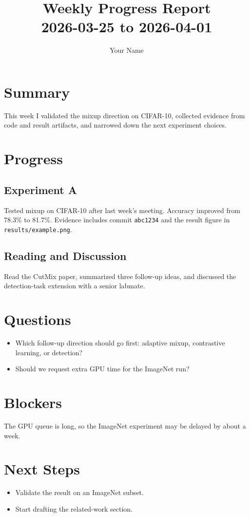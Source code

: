 \documentclass[11pt,a4paper]{article}
\title{Weekly Progress Report \\ \large 2026-03-25 to 2026-04-01}
\author{Your Name}
\date{}
\begin{document}
\maketitle

\section{Summary}
This week I validated the mixup direction on CIFAR-10, collected evidence from code and result artifacts, and narrowed down the next experiment choices.

\section{Progress}

\subsection{Experiment A}
Tested mixup on CIFAR-10 after last week's meeting. Accuracy improved from 78.3\% to 81.7\%. Evidence includes commit \texttt{abc1234} and the result figure in \texttt{results/example.png}.


\subsection{Reading and Discussion}
Read the CutMix paper, summarized three follow-up ideas, and discussed the detection-task extension with a senior labmate.

\section{Questions}
\begin{itemize}[leftmargin=2em]
  \item Which follow-up direction should go first: adaptive mixup, contrastive learning, or detection?
  \item Should we request extra GPU time for the ImageNet run?
\end{itemize}

\section{Blockers}
The GPU queue is long, so the ImageNet experiment may be delayed by about a week.

\section{Next Steps}
\begin{itemize}[leftmargin=2em]
  \item Validate the result on an ImageNet subset.
  \item Start drafting the related-work section.
\end{itemize}
\end{document}
